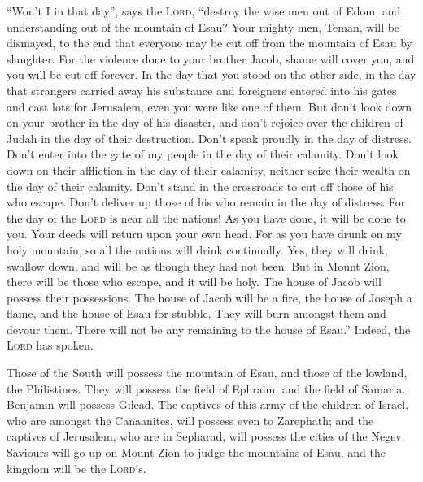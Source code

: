  ``Won't I in that day'', says the \textsc{Lord},
``destroy the wise men out of Edom, and understanding out of the
mountain of Esau?  Your mighty men, Teman, will be
dismayed, to the end that everyone may be cut off from the mountain of
Esau by slaughter.  For the violence done to your brother
Jacob, shame will cover you, and you will be cut off forever.
 In the day that you stood on the other side, in the day
that strangers carried away his substance and foreigners entered into
his gates and cast lots for Jerusalem, even you were like one of them.
 But don't look down on your brother in the day of his
disaster, and don't rejoice over the children of Judah in the day of
their destruction. Don't speak proudly in the day of distress.
 Don't enter into the gate of my people in the day of
their calamity. Don't look down on their affliction in the day of their
calamity, neither seize their wealth on the day of their calamity.
 Don't stand in the crossroads to cut off those of his
who escape. Don't deliver up those of his who remain in the day of
distress.  For the day of the \textsc{Lord} is near all
the nations! As you have done, it will be done to you. Your deeds will
return upon your own head.  For as you have drunk on my
holy mountain, so all the nations will drink continually. Yes, they will
drink, swallow down, and will be as though they had not been.
 But in Mount Zion, there will be those who escape, and
it will be holy. The house of Jacob will possess their possessions.
 The house of Jacob will be a fire, the house of Joseph a
flame, and the house of Esau for stubble. They will burn amongst them
and devour them. There will not be any remaining to the house of Esau.''
Indeed, the \textsc{Lord} has spoken.

 Those of the South will possess the mountain of Esau,
and those of the lowland, the Philistines. They will possess the field
of Ephraim, and the field of Samaria. Benjamin will possess Gilead.
 The captives of this army of the children of Israel, who
are amongst the Canaanites, will possess even to Zarephath; and the
captives of Jerusalem, who are in Sepharad, will possess the cities of
the Negev.  Saviours will go up on Mount Zion to judge
the mountains of Esau, and the kingdom will be the \textsc{Lord}'s.
